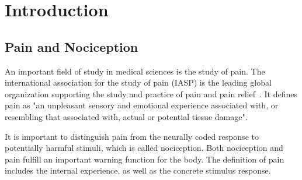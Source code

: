 \chapter{Introduction}
\label{intro_chapter}
\begin{comment}
In this chapter I will give an introduction to the topic. I will give background information about neuropathic pain and the big picture goal of research in this field. \\
-quickly explain how the transmission of pain functions inside our bodies\\
-what is my bachelor thesis based on (paper from Roberto)\\
-contextualize thesis topic within the big picture \\
-talk quickly about openMNGlab and goal of adding analysis functionality and discuss software engineering goals for the framework\\

nociception/pain\\
neuropathic pain -> constant firing\\
measuring data -> microneurography\\
analyzing data -> openMNGlab\\
results -> ideas for problemsolving

C fibers
when these fibers fire all the time this is called neuropathic pain
\end{comment}
\section{Pain and Nociception}
An important field of study in medical sciences is the study of pain. The international association for the study of pain (IASP) is the leading global organization supporting the study and practice of pain and pain relief~\cite{iasp_2022}. It defines pain as "an unpleasant sensory and emotional experience associated with, or resembling that associated with, actual or potential tissue damage".

It is important to distinguish pain from the neurally coded response to potentially harmful stimuli, which is called nociception. Both nociception and pain fulfill an important warning function for the body. The definition of pain includes the internal experience, as well as the concrete stimulus response.

